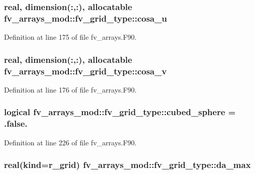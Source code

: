 \subsubsection[{cosa\-\_\-u}]{\setlength{\rightskip}{0pt plus 5cm}real, dimension(\-:,\-:), allocatable fv\-\_\-arrays\-\_\-mod\-::fv\-\_\-grid\-\_\-type\-::cosa\-\_\-u}\label{structfv__arrays__mod_1_1fv__grid__type_ae5c3bb087e289619efb5f97c042260c5}


Definition at line 175 of file fv\-\_\-arrays.\-F90.

\subsubsection[{cosa\-\_\-v}]{\setlength{\rightskip}{0pt plus 5cm}real, dimension(\-:,\-:), allocatable fv\-\_\-arrays\-\_\-mod\-::fv\-\_\-grid\-\_\-type\-::cosa\-\_\-v}\label{structfv__arrays__mod_1_1fv__grid__type_aea1d9e2e29779a878372fa6217b566ca}


Definition at line 176 of file fv\-\_\-arrays.\-F90.

\subsubsection[{cubed\-\_\-sphere}]{\setlength{\rightskip}{0pt plus 5cm}logical fv\-\_\-arrays\-\_\-mod\-::fv\-\_\-grid\-\_\-type\-::cubed\-\_\-sphere = .false.}\label{structfv__arrays__mod_1_1fv__grid__type_aa17b47beeccc44f1126d9fb059a13b12}


Definition at line 226 of file fv\-\_\-arrays.\-F90.

\subsubsection[{da\-\_\-max}]{\setlength{\rightskip}{0pt plus 5cm}real(kind={\bf r\-\_\-grid}) fv\-\_\-arrays\-\_\-mod\-::fv\-\_\-grid\-\_\-type\-::da\-\_\-max}\label{structfv__arrays__mod_1_1fv__grid__type_a811a33a354e8247dfe9ec8d6680d1ee5}


